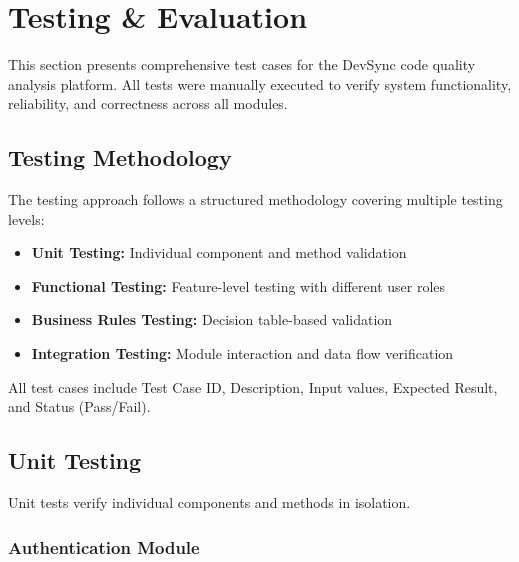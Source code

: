 \documentclass[12pt,a4paper]{article}
\begin{document}
    \section{Testing \& Evaluation}

    This section presents comprehensive test cases for the DevSync code quality analysis platform. All tests were manually executed to verify system functionality, reliability, and correctness across all modules.

    \subsection{Testing Methodology}

    The testing approach follows a structured methodology covering multiple testing levels:

    \begin{itemize}[leftmargin=0.5in]
        \item \textbf{Unit Testing:} Individual component and method validation
        \item \textbf{Functional Testing:} Feature-level testing with different user roles
        \item \textbf{Business Rules Testing:} Decision table-based validation
        \item \textbf{Integration Testing:} Module interaction and data flow verification
    \end{itemize}

    All test cases include Test Case ID, Description, Input values, Expected Result, and Status (Pass/Fail).

    \subsection{Unit Testing}

    Unit tests verify individual components and methods in isolation.

    \subsubsection{Authentication Module}
\end{document}
